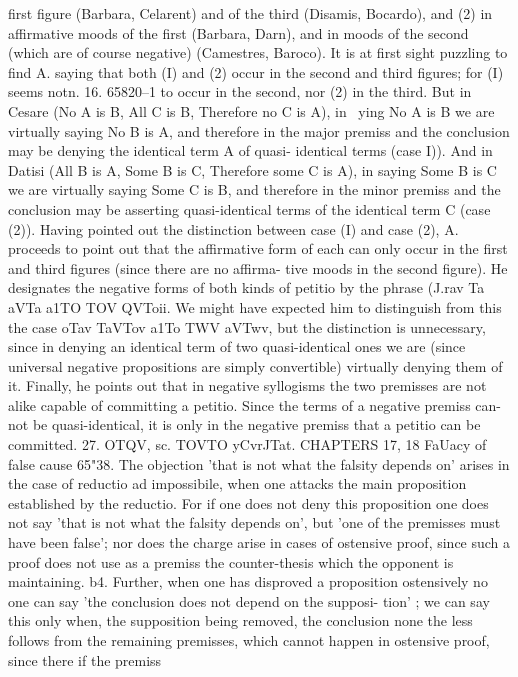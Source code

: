 {{{{{{first figure (Barbara, Celarent) and of the third (Disamis, Bocardo),
and (2) in affirmative moods of the first (Barbara, Darn), and in
moods of the second (which are of course negative) (Camestres,
Baroco). It is at first sight puzzling to find A. saying that both
(I) and (2) occur in the second and third figures; for (I) seems notn.
16. 65820--1
to occur in the second, nor (2) in the third. But in Cesare (No A is
B, All C is B, Therefore no C is A), in ~ying No A is B we are
virtually saying No B is A, and therefore in the major premiss and
the conclusion may be denying the identical term A of quasi-
identical terms (case I)). And in Datisi (All B is A, Some B is C,
Therefore some C is A), in saying Some B is C we are virtually
saying Some C is B, and therefore in the minor premiss and the
conclusion may be asserting quasi-identical terms of the identical
term C (case (2)).
Having pointed out the distinction between case (I) and case
(2), A. proceeds to point out that the affirmative form of each can
only occur in the first and third figures (since there are no affirma-
tive moods in the second figure). He designates the negative
forms of both kinds of petitio by the phrase (J.rav Ta aVTa a1TO TOV
QVToii. We might have expected him to distinguish from this the
case oTav TaVTov a1To TWV aVTwv, but the distinction is unnecessary,
since in denying an identical term of two quasi-identical ones we
are (since universal negative propositions are simply convertible)
virtually denying them of it. Finally, he points out that in
negative syllogisms the two premisses are not alike capable of
committing a petitio. Since the terms of a negative premiss can-
not be quasi-identical, it is only in the negative premiss that a
petitio can be committed.
27. OTQV, sc. TOVTO yCvrJTat.
CHAPTERS 17, 18
FaUacy of false cause
65"38. The objection 'that is not what the falsity depends on'
arises in the case of reductio ad impossibile, when one attacks the
main proposition established by the reductio. For if one does not
deny this proposition one does not say 'that is not what the falsity
depends on', but 'one of the premisses must have been false'; nor
does the charge arise in cases of ostensive proof, since such a proof
does not use as a premiss the counter-thesis which the opponent is
maintaining.
b4. Further, when one has disproved a proposition ostensively
no one can say 'the conclusion does not depend on the supposi-
tion' ; we can say this only when, the supposition being removed,
the conclusion none the less follows from the remaining premisses,
which cannot happen in ostensive proof, since there if the premiss
}}}}}}
